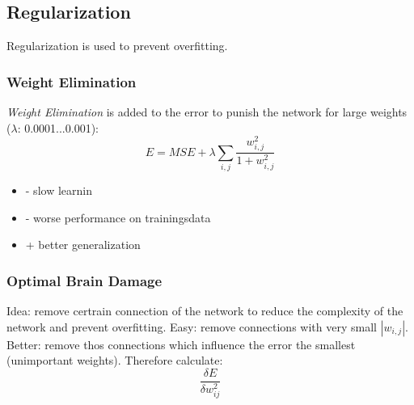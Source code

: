 \subsection{Regularization}
\label{ssect:regularization}
Regularization is used to prevent overfitting.

\subsubsection{Weight Elimination}
\textit{Weight Elimination} is added to the error to punish the network for large weights ($\lambda$: 0.0001...0.001):
\[
E = MSE + \lambda \sum_{i,j} \frac{w_{i,j}^2}{1 + w_{i,j}^2}
\]
\begin{itemize}
	\item - slow learnin
	\item - worse performance on trainingsdata
	\item + better generalization
\end{itemize}

\subsubsection{Optimal Brain Damage}
\label{sssect:optimal-brain-damage}
Idea: remove certrain connection of the network to reduce the complexity of the network and prevent overfitting. Easy: remove connections with very small $|w_{i,j}|$. Better: remove thos connections which influence the error the smallest (unimportant weights). Therefore calculate:
\[
\frac{\delta E}{\delta w_{ij}^2}
\]
